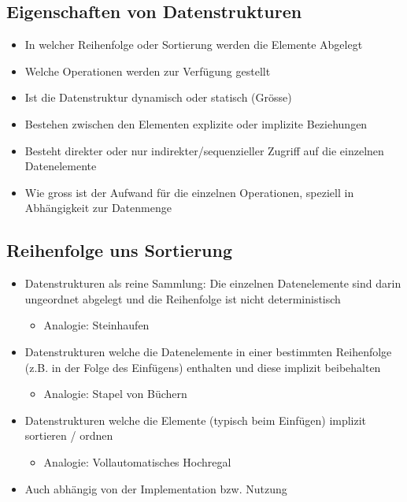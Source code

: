 \documentclass[10pt,a4paper]{article}
\begin{document}
\subsection{Eigenschaften von Datenstrukturen}
\begin{itemize}[noitemsep,topsep=0pt,leftmargin=*]
    \item In welcher Reihenfolge oder Sortierung werden die Elemente Abgelegt
    \item Welche Operationen werden zur Verfügung gestellt
    \item Ist die Datenstruktur dynamisch oder statisch (Grösse)
    \item Bestehen zwischen den Elementen explizite oder implizite Beziehungen
    \item Besteht direkter oder nur indirekter/sequenzieller Zugriff auf die einzelnen Datenelemente
    \item Wie gross ist der Aufwand für die einzelnen Operationen, speziell in Abhängigkeit zur Datenmenge
\end{itemize}

\subsection{Reihenfolge uns Sortierung}
\begin{itemize}[noitemsep,topsep=0pt,leftmargin=*]
    \item Datenstrukturen als reine Sammlung: Die einzelnen Datenelemente sind darin ungeordnet abgelegt und die Reihenfolge ist nicht deterministisch
    \begin{itemize}[noitemsep,topsep=0pt,leftmargin=*]
        \item Analogie: Steinhaufen
    \end{itemize}
    \item Datenstrukturen welche die Datenelemente in einer bestimmten Reihenfolge (z.B. in der Folge des Einfügens) enthalten und diese implizit beibehalten
    \begin{itemize}[noitemsep,topsep=0pt,leftmargin=*]
        \item Analogie: Stapel von Büchern
    \end{itemize}
    \item Datenstrukturen welche die Elemente (typisch beim Einfügen) implizit sortieren / ordnen
    \begin{itemize}[noitemsep,topsep=0pt,leftmargin=*]
        \item Analogie: Vollautomatisches Hochregal
    \end{itemize}
    \item Auch abhängig von der Implementation bzw. Nutzung
\end{itemize}
\end{document}

